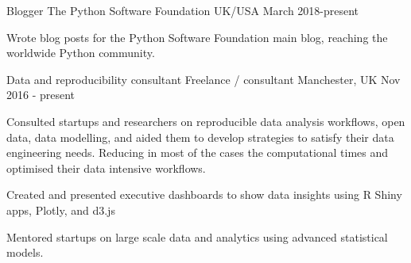 


\begin{cventries}



\cventry
{Blogger} %
{The Python Software Foundation } %
{UK/USA} %
{March 2018-present } %
{ %
\begin{cvitems}
\item {Wrote blog posts for the Python Software Foundation main blog, reaching the worldwide Python community.}
\end{cvitems}
}



\cventry
{Data and reproducibility consultant } %
{Freelance / consultant } %
{Manchester,  UK} %
{Nov 2016 - present } %
{ %
\begin{cvitems}
\item {Consulted startups and researchers on reproducible data analysis workflows, open data, data modelling, and aided them to develop strategies to satisfy their data engineering needs. Reducing in most of the cases the computational times and optimised their data intensive workflows.}
 \item {Created and presented executive dashboards to show data insights using R Shiny apps, Plotly, and d3.js}
 \item {Mentored startups on large scale data and analytics using advanced statistical models.}
\end{cvitems}
}




\end{cventries}
